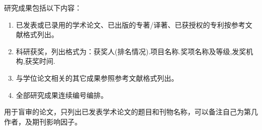 
{}

研究成果包括以下内容：
\begin{enumerate}
	\item 已发表或已录用的学术论文、已出版的专著/译著、已获授权的专利按参考文献格式列出。
	\item 科研获奖，列出格式为：获奖人(排名情况).项目名称.奖项名称及等级,发奖机构,获奖时间.
	\item 与学位论文相关的其它成果参照参考文献格式列出。
	\item 全部研究成果连续编号编排。
\end{enumerate}

\vspace{\baselineskip}
{\color{red}用于盲审的论文，只列出已发表学术论文的题目和刊物名称，可以备注自己为第几作者，及期刊影响因子。}
